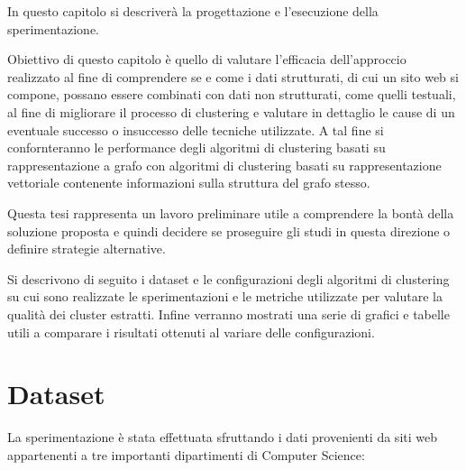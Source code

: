 

In questo capitolo si descriverà la progettazione e l’esecuzione della sperimentazione. 

Obiettivo di questo capitolo è quello di valutare l’efficacia dell'approccio realizzato al fine di comprendere se e come i dati strutturati, di cui un sito web si compone,  possano essere combinati con dati non strutturati, come quelli testuali, al fine di migliorare il processo di clustering e valutare in dettaglio le cause di un eventuale successo o insuccesso delle tecniche utilizzate.
A tal fine si confornteranno le performance degli algoritmi di clustering basati su rappresentazione a grafo con algoritmi di clustering basati su rappresentazione vettoriale contenente informazioni sulla struttura del grafo stesso.
 
Questa tesi rappresenta un lavoro preliminare utile a comprendere la bontà della soluzione proposta e quindi decidere se proseguire gli studi in questa direzione o definire strategie alternative.

Si descrivono di seguito i dataset e le configurazioni degli algoritmi di clustering su cui sono realizzate le sperimentazioni e le metriche utilizzate per valutare la qualità dei cluster estratti. Infine verranno mostrati una serie di grafici e tabelle utili a comparare i risultati ottenuti al variare delle configurazioni.

\section{Dataset}
La sperimentazione è stata effettuata sfruttando i dati provenienti da siti web appartenenti a tre importanti dipartimenti di Computer Science:

